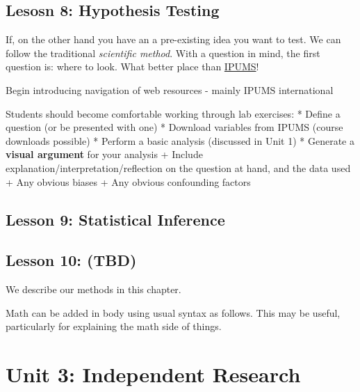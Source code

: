\documentclass[
]{book}
\begin{document}
\hypertarget{lesosn-8-hypothesis-testing}{%
\section*{Lesosn 8: Hypothesis Testing}\label{lesosn-8-hypothesis-testing}}

If, on the other hand you have an a pre-existing idea you want to test. We can follow the traditional \emph{scientific method}. With a question in mind, the first question is: where to look. What better place than \href{https://ipums.org}{IPUMS}!

Begin introducing navigation of web resources - mainly IPUMS international

Students should become comfortable working through lab exercises:
* Define a question (or be presented with one)
* Download variables from IPUMS (course downloads possible)
* Perform a basic analysis (discussed in Unit 1)
* Generate a \textbf{visual argument} for your analysis
+ Include explanation/interpretation/reflection on the question at hand, and the data used
+ Any obvious biases
+ Any obvious confounding factors

\hypertarget{lesson-9-statistical-inference}{%
\section*{Lesson 9: Statistical Inference}\label{lesson-9-statistical-inference}}

\hypertarget{lesson-10-tbd}{%
\section*{Lesson 10: (TBD)}\label{lesson-10-tbd}}

We describe our methods in this chapter.

Math can be added in body using usual syntax as follows. This may be useful, particularly for explaining the math side of things.

\hypertarget{unit-3-independent-research}{%
\chapter*{Unit 3: Independent Research}\label{unit-3-independent-research}}
\end{document}
